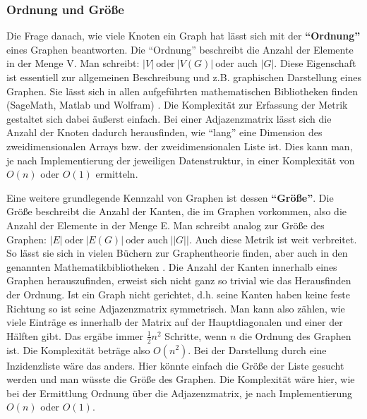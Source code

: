 \documentclass[a4paper,12pt,ngerman,chapterprefix=false,listof=totoc,bibliography=totoc]{scrreprt}
\begin{document}
\subsubsection*{Ordnung und Größe}
{
Die Frage danach, wie viele Knoten ein Graph hat lässt sich mit der \textbf{"`Ordnung"'} eines Graphen beantworten. Die "`Ordnung"' beschreibt die Anzahl der Elemente in der Menge V. Man schreibt: \(\vert V\vert\ \text{oder}\ \vert V(G)\vert\ \text{oder}\) auch \(\vert G\vert\). \cite{diestel_graphentheorie_2000} Diese Eigenschaft ist essentiell zur allgemeinen Beschreibung und z.B. graphischen Darstellung eines Graphen. Sie lässt sich in allen aufgeführten mathematischen Bibliotheken finden (SageMath, Matlab und Wolfram) \cite{sagemath_graph_2020,matlab_directed_2020,wolfram_graph_2020}. Die Komplexität zur Erfassung der Metrik gestaltet sich dabei äußerst einfach. Bei einer Adjazenzmatrix lässt sich die Anzahl der Knoten dadurch herausfinden, wie "`lang"' eine Dimension des zweidimensionalen Arrays bzw. der zweidimensionalen Liste ist. Dies kann man, je nach Implementierung der jeweiligen Datenstruktur, in einer Komplexität von \(O(n)\) oder \(O(1)\) ermitteln.

Eine weitere grundlegende Kennzahl von Graphen ist dessen \textbf{"`Größe"'}. Die Größe beschreibt die Anzahl der Kanten, die im Graphen vorkommen, also die Anzahl der Elemente in der Menge E. Man schreibt analog zur Größe des Graphen: \(\vert E\vert\ \text{oder}\ \vert E(G)\vert\ \text{oder}\) \(\text{auch}\ \vert\vert G \vert\vert\). \cite{balakrishnan_schaums_1997,diestel_graphentheorie_2000} Auch diese Metrik ist weit verbreitet. So lässt sie sich in vielen Büchern zur Graphentheorie finden, aber auch in den genannten Mathematikbibliotheken \cite{sagemath_graph_2020,matlab_directed_2020,wolfram_graph_2020}. Die Anzahl der Kanten innerhalb eines Graphen herauszufinden, erweist sich nicht ganz so trivial wie das Herausfinden der Ordnung. Ist ein Graph nicht gerichtet, d.h. seine Kanten haben keine feste Richtung \cite{diestel_graphentheorie_2000} so ist seine Adjazenzmatrix symmetrisch. Man kann also zählen, wie viele Einträge es innerhalb der Matrix auf der Hauptdiagonalen und einer der Hälften gibt. Das ergäbe immer \(\frac{1}{2}n^2\) Schritte, wenn \(n\) die Ordnung des Graphen ist. Die Komplexität beträge also \(O(n^2)\). Bei der Darstellung durch eine Inzidenzliste wäre das anders. Hier könnte einfach die Größe der Liste gesucht werden und man wüsste die Größe des Graphen. Die Komplexität wäre hier, wie bei der Ermittlung Ordnung über die Adjazenzmatrix, je nach Implementierung \(O(n)\) oder \(O(1)\).
}
\end{document}

